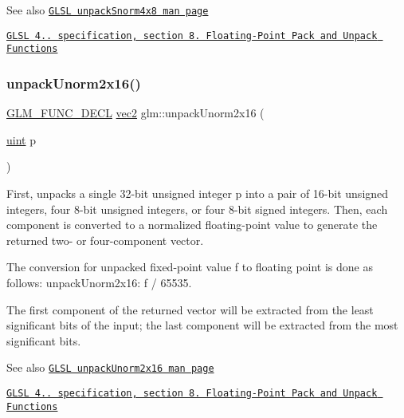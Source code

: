 \begin{DoxySeeAlso}{See also}
\href{http://www.opengl.org/sdk/docs/manglsl/xhtml/unpackSnorm4x8.xml}{\tt G\+L\+SL unpack\+Snorm4x8 man page} 

\href{http://www.opengl.org/registry/doc/GLSLangSpec.4.20.8.pdf}{\tt G\+L\+SL 4.. specification, section 8. Floating-\/\+Point Pack and Unpack Functions} 
\end{DoxySeeAlso}
\mbox{\label{group__core__func__packing_ga1f66188e5d65afeb9ffba1ad971e4007}} 
\subsubsection{\texorpdfstring{unpack\+Unorm2x16()}{unpackUnorm2x16()}}
{\footnotesize\ttfamily \hyperlink{setup_8hpp_ab2d052de21a70539923e9bcbf6e83a51}{G\+L\+M\+\_\+\+F\+U\+N\+C\+\_\+\+D\+E\+CL} \hyperlink{group__core__types_gaa1618f51db67eaa145db101d8c8431d8}{vec2} glm\+::unpack\+Unorm2x16 (\begin{DoxyParamCaption}\item[{\hyperlink{group__core__precision_ga4fd29415871152bfb5abd588334147c8}{uint}}]{p }\end{DoxyParamCaption})}

First, unpacks a single 32-\/bit unsigned integer p into a pair of 16-\/bit unsigned integers, four 8-\/bit unsigned integers, or four 8-\/bit signed integers. Then, each component is converted to a normalized floating-\/point value to generate the returned two-\/ or four-\/component vector.

The conversion for unpacked fixed-\/point value f to floating point is done as follows\+: unpack\+Unorm2x16\+: f / 65535.

The first component of the returned vector will be extracted from the least significant bits of the input; the last component will be extracted from the most significant bits.

\begin{DoxySeeAlso}{See also}
\href{http://www.opengl.org/sdk/docs/manglsl/xhtml/unpackUnorm2x16.xml}{\tt G\+L\+SL unpack\+Unorm2x16 man page} 

\href{http://www.opengl.org/registry/doc/GLSLangSpec.4.20.8.pdf}{\tt G\+L\+SL 4.. specification, section 8. Floating-\/\+Point Pack and Unpack Functions} 
\end{DoxySeeAlso}
\mbox{\label{group__core__func__packing_ga7f903259150b67e9466f5f8edffcd197}} 
